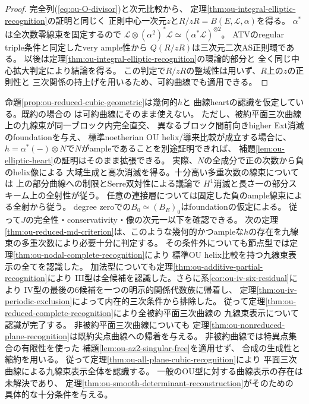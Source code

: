 \begin{proof}
完全列(\ref{eq:ou-O-divisor})と次元比較から、
定理\ref{thm:ou-integral-elliptic-recognition}の証明と同じく
正則中心一次元$z$と$R/zR=B(E,\mathcal L,\alpha)$を得る。
$\alpha^*$は全次数零線束を固定するので
$\mathcal L\otimes(\alpha^2)^*\mathcal L\simeq
(\alpha^*\mathcal L)^{\otimes2}$。
ATVのregular triple条件と同定したvery ample性から
$Q(R/zR)$は三次元二次AS正則環である。
以後は定理\ref{thm:ou-integral-elliptic-recognition}の環論的部分と
全く同じ中心拡大判定により結論を得る。
この判定で$R/zR$の整域性は用いず、$R$上の$z$の正則性と
三次関係の持上げを用いるため、可約曲線でも適用できる。
\end{proof}

\begin{remark}[可約曲線での実際の残存課題]\label{rem:ou-reduced-curve-gap}
命題\ref{prop:ou-reduced-cubic-geometric}は幾何的$h$と
曲線heartの認識を仮定している。既約の場合の
\cite[Corollary~5.8]{BurbanKreu2006}は可約曲線にそのまま使えない。
ただし、被約平面三次曲線上の九線束が同一ブロック内完全直交、
異なるブロック間前向きhigher Ext消滅のfoundationを与え、
標準noetherian OU helix/導来比較が成立する場合に、
$h=\alpha^*(-)\otimes N$で$N$がampleであることを別途証明できれば、
補題\ref{lem:ou-elliptic-heart}の証明はそのまま拡張できる。
実際、$N$の全成分で正の次数から負のhelix像による
大域生成と高次消滅を得る。十分高い多重次数の線束については
上の部分曲線への制限とSerre双対性による議論で
$H^1$消滅と長さ一の部分スキーム上の全射性が従う。
任意の連接層については固定した負のample線束による全射から従う。
degree zeroでの$B_0\simeq(B_E)_0$はfoundationの仮定による。
従って$J$の完全性・conservativity・像の次元一以下を確認できる。
次の定理\ref{thm:ou-reduced-md-criterion}は、このような幾何的かつampleな$h$の存在を九線束の多重次数により必要十分に判定する。
その条件外についても節点型では定理\ref{thm:ou-nodal-complete-recognition}により
標準OU helix比較を持つ九線束表示の全てを認識した。
加法型についても定理\ref{thm:ou-additive-partial-recognition}により
III型は全候補を認識した。さらに系\ref{cor:ou-iv-six-residual}により
IV型の最後の6候補を一つの明示的関係代数族に帰着し、
定理\ref{thm:ou-iv-periodic-exclusion}によって内在的三次条件から排除した。
従って定理\ref{thm:ou-reduced-complete-recognition}により全被約平面三次曲線の
九線束表示について認識が完了する。
非被約平面三次曲線についても
定理\ref{thm:ou-nonreduced-plane-recognition}は既約尖点曲線への帰着を与える。
非被約曲線では特異点集合の有限性を使った
補題\ref{lem:ou-az2-singular-free}を適用せず、
合成の生成性と縮約を用いる。
従って定理\ref{thm:ou-all-plane-cubic-recognition}により
平面三次曲線による九線束表示全体を認識する。
一般のOU型に対する曲線表示の存在は未解決であり、
定理\ref{thm:ou-smooth-determinant-reconstruction}がそのための
具体的な十分条件を与える。
\end{remark}

